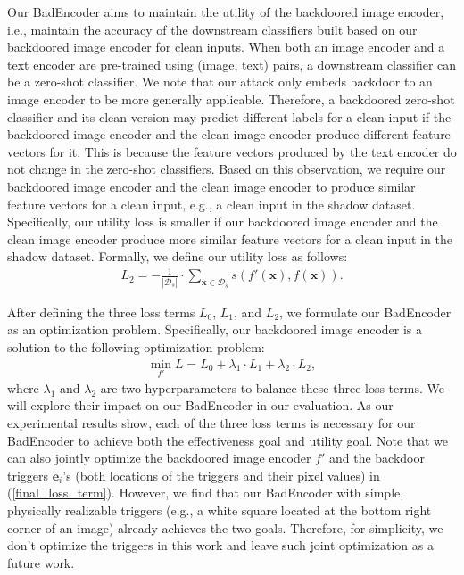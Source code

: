  Our BadEncoder aims to maintain the utility of the backdoored image encoder,  
i.e., maintain the accuracy of the downstream classifiers built based on our backdoored image encoder for clean inputs. 
 When both an image encoder and a text encoder are pre-trained using (image, text) pairs, a downstream classifier can be a zero-shot classifier. We note that our attack only embeds backdoor to an image encoder to be more generally applicable. Therefore, a backdoored zero-shot classifier and its clean version may predict different labels for a clean input if the backdoored image encoder and the clean image encoder produce different feature vectors for it. This is because the feature vectors produced by the text encoder do not change in the zero-shot classifiers. 
 Based on this observation, we require our backdoored image encoder and the clean image encoder to produce similar feature vectors for a clean input, e.g., a clean input in the shadow dataset. Specifically, our utility loss is smaller if our backdoored image encoder and the clean image encoder produce more similar feature vectors for a clean input in the shadow dataset. 
Formally, we define our utility loss as follows:
\begin{align}
    L_2 = - \frac{1}{|\mathcal{D}_s|} \cdot \sum_{\mathbf{x} \in \mathcal{D}_s} s(f'(\mathbf{x}), f(\mathbf{x})). 
\end{align}



 After defining the three loss terms $L_0$, $L_1$, and $L_2$, we formulate our BadEncoder as  an optimization problem. Specifically, our backdoored image encoder is a solution to the following optimization problem:
\begin{align}
\label{final_loss_term}
\min_{f'} L = L_0 + \lambda_1 \cdot L_1 + \lambda_2 \cdot L_2,
\end{align}
where $\lambda_1$ and $\lambda_2$ are two hyperparameters to balance these three loss terms. 
We will explore their impact on our BadEncoder in our evaluation. As our experimental results show, each of the three loss terms is necessary for our BadEncoder to achieve both the effectiveness goal and utility goal. Note that we can also jointly optimize the backdoored image encoder $f'$ and the backdoor triggers  $\mathbf{e}_i$'s (both locations of the triggers and their pixel values) in (\ref{final_loss_term}). However, we find that our BadEncoder with simple, physically realizable triggers (e.g., a white square located at the bottom right corner of an image) already achieves the two goals. Therefore, for simplicity, we don't optimize the  triggers in this work and leave such joint optimization as a future work. 













